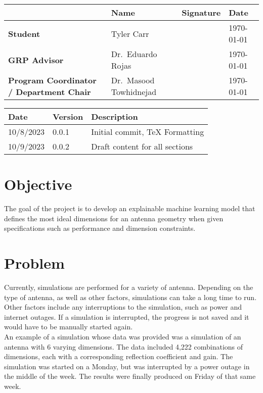 \documentclass[12pt, letterpaper, notitlepage]{article}
\begin{document}
\newpage

\begin{center}
\bgroup
\footnotesize
\def\arraystretch{1.5}
\centering
\noindent\begin{tabular}{|p{12em}|l|p{12em}|l|} \hline
    \rowcolor{lightgray}& \textbf{Name} & \textbf{Signature} & \textbf{Date} \\ \hline
    \textbf{Student} & Tyler Carr & & \today \\ \hline
    \textbf{GRP Advisor} & Dr.\ Eduardo Rojas & & \today \\ \hline
    \textbf{Program Coordinator / Department Chair} & Dr.\ Masood Towhidnejad & & \today \\ \hline
\end{tabular}
\egroup
\end{center}

\newpage

\begin{center}
\centering
\noindent\begin{tabular}{|l|l|l|} \hline
    \rowcolor{lightgray}\textbf{Date} & \textbf{Version} & \textbf{Description} \\ \hline
    10/8/2023 & 0.0.1 & Initial commit, TeX Formatting\\ \hline
    10/9/2023 & 0.0.2 & Draft content for all sections\\ \hline
\end{tabular}
\vspace*{1em}
\end{center}


\section*{Objective}
The goal of the project is to develop an explainable machine learning model that defines the most ideal dimensions for an antenna geometry when given specifications such as performance and dimension constraints.\\


\section*{Problem}
Currently, simulations are performed for a variety of antenna. Depending on the type of antenna, as well as other factors, simulations can take a long time to run. Other factors include any interruptions to the simulation, such as power and internet outages. If a simulation is interrupted, the progress is not saved and it would have to be manually started again.\\
An example of a simulation whose data was provided was a simulation of an antenna with 6 varying dimensions. The data included 4,222 combinations of dimensions, each with a corresponding reflection coefficient and gain. The simulation was started on a Monday, but was interrupted by a power outage in the middle of the week. The results were finally produced on Friday of that same week. \\
\end{document}
